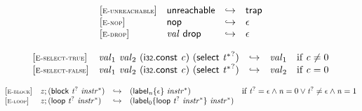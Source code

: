 \vspace{1ex}

\vspace{1ex}

$$
\begin{array}{@{}l@{}lcl@{}l@{}}
{[\textsc{\scriptsize E{-}unreachable}]} \quad & \mathsf{unreachable} &\hookrightarrow& \mathsf{trap} &  \\
{[\textsc{\scriptsize E{-}nop}]} \quad & \mathsf{nop} &\hookrightarrow& \epsilon &  \\
{[\textsc{\scriptsize E{-}drop}]} \quad & {\mathit{val}}~\mathsf{drop} &\hookrightarrow& \epsilon &  \\
\end{array}
$$

\vspace{1ex}

$$
\begin{array}{@{}l@{}lcl@{}l@{}}
{[\textsc{\scriptsize E{-}select{-}true}]} \quad & {\mathit{val}}_{{1}}~{\mathit{val}}_{{2}}~(\mathsf{i{\scriptstyle32}}.\mathsf{const}~{\mathit{c}})~(\mathsf{select}~{{{\mathit{t}}^\ast}^?}) &\hookrightarrow& {\mathit{val}}_{{1}} &\quad
  \mbox{if}~{\mathit{c}} \neq 0 \\
{[\textsc{\scriptsize E{-}select{-}false}]} \quad & {\mathit{val}}_{{1}}~{\mathit{val}}_{{2}}~(\mathsf{i{\scriptstyle32}}.\mathsf{const}~{\mathit{c}})~(\mathsf{select}~{{{\mathit{t}}^\ast}^?}) &\hookrightarrow& {\mathit{val}}_{{2}} &\quad
  \mbox{if}~{\mathit{c}} = 0 \\
\end{array}
$$

\vspace{1ex}

$$
\begin{array}{@{}l@{}lcl@{}l@{}}
{[\textsc{\scriptsize E{-}block}]} \quad & {\mathit{z}} ; (\mathsf{block}~{{\mathit{t}}^?}~{{\mathit{instr}}^\ast}) &\hookrightarrow& ({{\mathsf{label}}_{{\mathit{n}}}}{\{\epsilon\}}~{{\mathit{instr}}^\ast}) &\quad
  \mbox{if}~{{\mathit{t}}^?} = \epsilon \land {\mathit{n}} = 0 \lor {{\mathit{t}}^?} \neq \epsilon \land {\mathit{n}} = 1 \\
{[\textsc{\scriptsize E{-}loop}]} \quad & {\mathit{z}} ; (\mathsf{loop}~{{\mathit{t}}^?}~{{\mathit{instr}}^\ast}) &\hookrightarrow& ({{\mathsf{label}}_{0}}{\{\mathsf{loop}~{{\mathit{t}}^?}~{{\mathit{instr}}^\ast}\}}~{{\mathit{instr}}^\ast}) &  \\
\end{array}
$$


